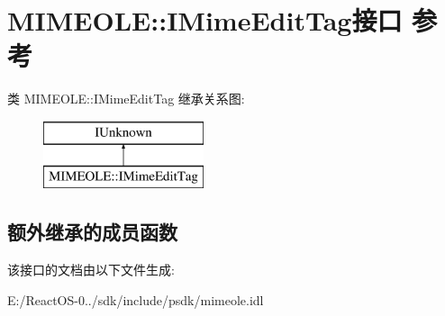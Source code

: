\hypertarget{interface_m_i_m_e_o_l_e_1_1_i_mime_edit_tag}{}\section{M\+I\+M\+E\+O\+LE\+:\+:I\+Mime\+Edit\+Tag接口 参考}
\label{interface_m_i_m_e_o_l_e_1_1_i_mime_edit_tag}
类 M\+I\+M\+E\+O\+LE\+:\+:I\+Mime\+Edit\+Tag 继承关系图\+:\begin{figure}[H]
\begin{center}
\leavevmode
\includegraphics[height=2.000000cm]{interface_m_i_m_e_o_l_e_1_1_i_mime_edit_tag}
\end{center}
\end{figure}
\subsection*{额外继承的成员函数}


该接口的文档由以下文件生成\+:\begin{DoxyCompactItemize}
\item 
E\+:/\+React\+O\+S-\/0../sdk/include/psdk/mimeole.\+idl\end{DoxyCompactItemize}
